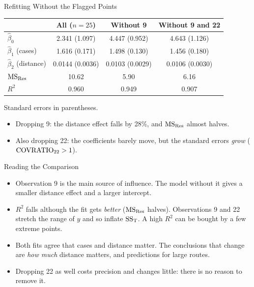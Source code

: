\begin{frame}{Refitting Without the Flagged Points}
    \begin{center}
        \small
        \begin{tabular}{lccc}
            \toprule
            & All ($n=25$) & Without 9 & Without 9 and 22 \\
            \midrule
            $\hat\beta_0$ & 2.341 (1.097) & 4.447 (0.952) & 4.643 (1.126) \\
            $\hat\beta_1$ (cases) & 1.616 (0.171) & 1.498 (0.130) & 1.456 (0.180) \\
            $\hat\beta_2$ (distance) & 0.0144 (0.0036) & 0.0103 (0.0029) & 0.0106 (0.0030) \\
            $\mathrm{MS}_{\mathrm{Res}}$ & 10.62 & 5.90 & 6.16 \\
            $R^2$ & 0.960 & 0.949 & 0.907 \\
            \bottomrule
        \end{tabular}
    \end{center}
    Standard errors in parentheses.
    \begin{itemize}
        \item Dropping 9: the distance effect falls by 28\%, and $\mathrm{MS}_{\mathrm{Res}}$ almost halves.
        \item Also dropping 22: the coefficients barely move, but the standard errors \emph{grow} ($\mathrm{COVRATIO}_{22}>1$).
    \end{itemize}
\end{frame}


\begin{frame}{Reading the Comparison}
    \begin{itemize}
        \item Observation 9 is the main source of influence. The model without it gives a smaller distance effect and a larger intercept.
        \item $R^2$ falls although the fit gets \emph{better} ($\mathrm{MS}_{\mathrm{Res}}$ halves). Observations 9 and 22 stretch the range of $y$ and so inflate $\mathrm{SS}_{\mathrm{T}}$. A high $R^2$ can be bought by a few extreme points.
        \item Both fits agree that cases and distance matter. The conclusions that change are \emph{how much} distance matters, and predictions for large routes.
        \item Dropping 22 as well costs precision and changes little: there is no reason to remove it.
    \end{itemize}
\end{frame}


